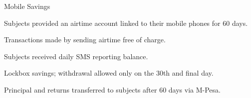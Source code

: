 \documentclass[aspectratio=169]{beamer}
\newenvironment{wideitemize}{\itemize\addtolength{\itemsep}{10pt}}{\enditemize}
\begin{document}
\begin{frame}{Mobile Savings}
	
	\begin{wideitemize}
		\item Subjects provided an airtime account linked to their mobile phones for 60 days.
		\item Transactions made by sending airtime free of charge.
		\item Subjects received daily SMS reporting balance.
		\item Lockbox savings; withdrawal allowed only on the 30th and final day.
		\item Principal and returns transferred to subjects after 60 days via M-Pesa.
	\end{wideitemize}


\end{frame}
\end{document}
